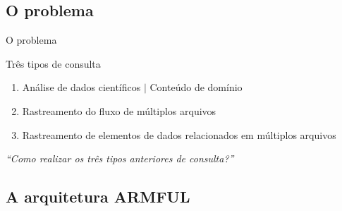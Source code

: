 \documentclass[12pt,compress,final]{beamer}
\begin{document}

\subsection*{O problema}

\begin{frame}[t]{O problema}
    \begin{exampleblock}{Três tipos de consulta}
    \begin{enumerate}
        \item Análise de \alert{dados científicos} $\mid$ Conteúdo de domínio
        \item Rastreamento do fluxo de \alert{múltiplos arquivos}
        \item Rastreamento de \alert{elementos de dados relacionados} em múltiplos arquivos
    \end{enumerate}
    \end{exampleblock}
    \vfill
    \pause
    \centerline{\textit{\large ``Como realizar os três tipos anteriores de consulta?''}}
    \vfill
\end{frame}


\subsection*{A arquitetura ARMFUL}
\end{document}
